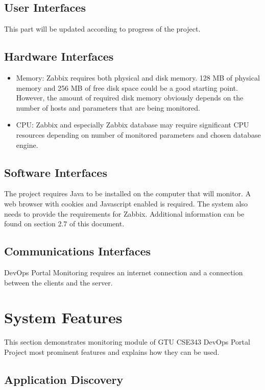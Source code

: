 \documentclass{article}
\begin{document}
\subsection{User Interfaces}

This part will be updated according to progress of the project.

\subsection{Hardware Interfaces}
\begin{itemize}
\item[]Memory:
    Zabbix requires both physical and disk memory. 128 MB of physical memory and 256 MB of free disk space could be a good starting point. However, the amount of required disk memory obviously depends on the number of hosts and parameters that are being monitored.
\item[]CPU:
   Zabbix and especially Zabbix database may require significant CPU resources depending on number of monitored parameters and chosen database engine.
\end{itemize}
\subsection{Software Interfaces}

     The project requires Java to be installed on the computer that will monitor. A web browser with cookies and Javascript enabled is required. The system also needs to provide the requirements for Zabbix. Additional information can be found on section 2.7 of this document.

\subsection{Communications Interfaces}

DevOps Portal Monitoring requires an internet connection and a connection between the clients and the server.

\section{System Features}

This section demonstrates monitoring module of GTU CSE343 DevOps Portal Project most prominent features and explains how they can be used.

\subsection{Application Discovery}
\end{document}
